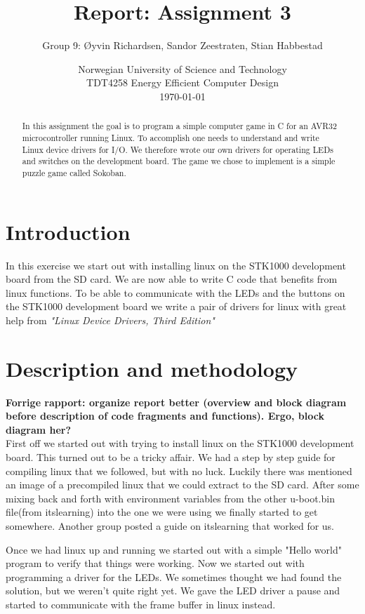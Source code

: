 \documentclass[a4paper,11pt]{article}
\title{\textbf{Report: Assignment 3}}
\author{Group 9: \O yvin Richardsen, Sandor Zeestraten, Stian Habbestad}
\date{{Norwegian University of Science and Technology \\
TDT4258 Energy Efficient Computer Design \\}
\today}
\begin{document}
\maketitle

\begin{abstract}
In this assignment the goal is to program a simple computer game in C for an AVR32 microcontroller running Linux. To accomplish one needs to understand and write Linux device drivers for I/O. We therefore wrote our own drivers for operating LEDs and switches on the development board. The game we chose to implement is a simple puzzle game called Sokoban.
\end{abstract}

\bigskip
\tableofcontents
\newpage

\section{Introduction}
In this exercise we start out with installing linux on the STK1000 development board from the SD card. We are now able to write C code that benefits from linux functions. %
To be able to communicate with the LEDs and the buttons on the STK1000 development board we write a pair of drivers for linux with great help from \textit{"Linux Device Drivers, Third Edition"} \cite{ldd}


\section{Description and methodology}

\textbf{Forrige rapport: organize report better (overview and block diagram before description of code fragments and functions). Ergo, block diagram her?}\\

First off we started out with trying to install linux on the STK1000 development board. This turned out to be a tricky affair. We had a step by step guide for compiling linux that we followed, but with no luck. Luckily there was mentioned an image of a precompiled linux that we could extract to the SD card. After some mixing back and forth with environment variables from the other u-boot.bin file(from itslearning) into the one we were using we finally started to get somewhere. Another group posted a guide on itslearning that worked for us.

Once we had linux up and running we started out with a simple "Hello world" program to verify that things were working. Now we started out with programming a driver for the LEDs. We sometimes thought we had found the solution, but we weren't quite right yet. We gave the LED driver a pause and started to communicate with the frame buffer in linux instead. 
\end{document}
